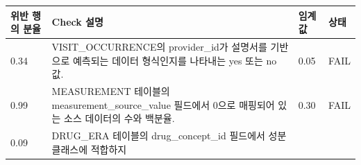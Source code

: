 \documentclass[11pt]{book}
\theoremstyle{definition}
\theoremstyle{definition}
\theoremstyle{definition}
\theoremstyle{remark}
\begin{document}
\begin{longtable}[]{@{}llll@{}}
\toprule
\begin{minipage}[b]{0.12\columnwidth}\raggedright\strut
위반 행의 분율\strut
\end{minipage} & \begin{minipage}[b]{0.47\columnwidth}\raggedright\strut
Check 설명\strut
\end{minipage} & \begin{minipage}[b]{0.10\columnwidth}\raggedright\strut
임계값\strut
\end{minipage} & \begin{minipage}[b]{0.07\columnwidth}\raggedright\strut
상태\strut
\end{minipage}\tabularnewline
\midrule
\endhead
\begin{minipage}[t]{0.12\columnwidth}\raggedright\strut
0.34\strut
\end{minipage} & \begin{minipage}[t]{0.47\columnwidth}\raggedright\strut
VISIT\_OCCURRENCE의 provider\_id가 설명서를 기반으로 예측되는 데이터
형식인지를 나타내는 yes 또는 no 값.\strut
\end{minipage} & \begin{minipage}[t]{0.10\columnwidth}\raggedright\strut
0.05\strut
\end{minipage} & \begin{minipage}[t]{0.07\columnwidth}\raggedright\strut
FAIL\strut
\end{minipage}\tabularnewline
\begin{minipage}[t]{0.12\columnwidth}\raggedright\strut
0.99\strut
\end{minipage} & \begin{minipage}[t]{0.47\columnwidth}\raggedright\strut
MEASUREMENT 테이블의 measurement\_source\_value 필드에서 0으로 매핑되어
있는 소스 데이터의 수와 백분율.\strut
\end{minipage} & \begin{minipage}[t]{0.10\columnwidth}\raggedright\strut
0.30\strut
\end{minipage} & \begin{minipage}[t]{0.07\columnwidth}\raggedright\strut
FAIL\strut
\end{minipage}\tabularnewline
\begin{minipage}[t]{0.12\columnwidth}\raggedright\strut
0.09\strut
\end{minipage} & \begin{minipage}[t]{0.47\columnwidth}\raggedright\strut
DRUG\_ERA 테이블의 drug\_concept\_id 필드에서 성분 클래스에 적합하지

\end{minipage}
\end{longtable}
\end{document}
